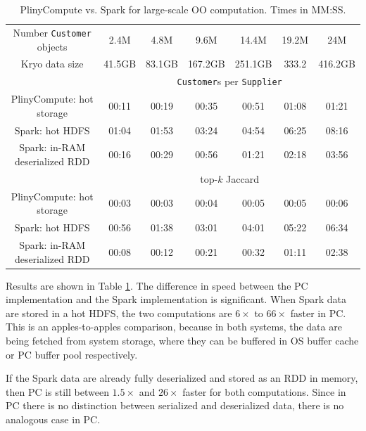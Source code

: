 \begin{table}[h!]
\begin{center}
\begin{tabular}{|c||c|c|c|c|c|c|}
\hline
Number \texttt{Customer} objects &2.4M & 4.8M & 9.6M  & 14.4M & 19.2M & 24M \\
Kryo data size &41.5GB & 83.1GB & 167.2GB &251.1GB &333.2 &416.2GB \\
\hline
& \multicolumn{6}{c|}{\texttt{Customer}s per \texttt{Supplier}} \\
\hline
PlinyCompute: hot storage & 00:11&	00:19&	00:35&	00:51&	01:08&	01:21 \\
Spark: hot HDFS & 01:04&	01:53&	03:24&	04:54&	06:25&	08:16\\
Spark: in-RAM deserialized RDD & 00:16& 	00:29& 	00:56& 	01:21& 	02:18& 	03:56\\
\hline
& \multicolumn{6}{c|}{top-$k$ Jaccard} \\
\hline
PlinyCompute: hot storage & 00:03&	00:03&	00:04&	00:05&	00:05&	00:06 \\
Spark: hot HDFS & 00:56&	01:38&	03:01 & 04:01&	05:22&	06:34\\
Spark: in-RAM deserialized RDD & 00:08& 	00:12& 	00:21 & 00:32& 	01:11& 	02:38\\
\hline
\end{tabular}
\caption{PlinyCompute vs. Spark for large-scale OO computation. Times in MM:SS.}
\label{fig:TPC}
\end{center}
\end{table}

Results are shown in Table \ref{fig:TPC}.  The difference in speed between the PC implementation and the Spark implementation
is significant.
When Spark data
are stored in
a hot HDFS, the two computations are $6\times$ to $66\times$ faster in PC.  
This is an apples-to-apples comparison, because in both systems, the data are being fetched from system storage, where they
can be buffered in OS buffer cache or PC buffer pool respectively.

If the Spark data are already
fully deserialized and stored as an RDD in memory, then PC is still 
between $1.5\times$ and $26\times$ faster
for both computations. Since in PC there is no distinction between
serialized and deserialized data, there is no analogous case in PC. 


